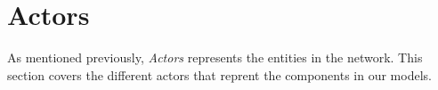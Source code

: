 


















\section{Actors}

As mentioned previously, \textit{Actors} represents the entities in the network. This section covers the different actors that reprent the components in our models. 

